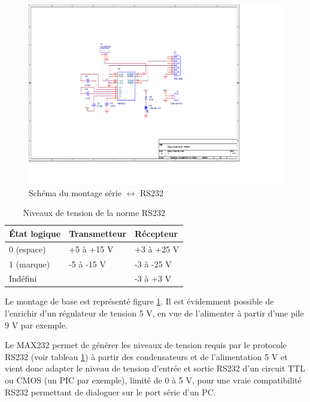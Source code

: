 \documentclass[a4paper]{article}
\begin{document}
\begin{figure}[H]
	\centering
	\includegraphics[scale=1.00]{Images/Montage_RS232}
	\caption{Schéma du montage série $\leftrightarrow$ RS232
		\label{Montage_RS232}}
\end{figure}

\begin{table}[H]
	\centering
	\begin{tabular}{|l|l|l|}\hline
			État logique & Transmetteur & Récepteur\\\hline\hline
			0 (espace) & +5 à +15 V & +3 à +25 V\\\hline
			1 (marque) & -5 à -15 V & -3 à -25 V\\\hline
			Indéfini & & -3 à +3 V\\\hline
	\end{tabular}
	\caption{Niveaux de tension de la norme RS232
		\label{Niveaux_de_tension_de_la_norme_RS232}}
\end{table}

Le montage de base est représenté figure \ref{Montage_RS232}. Il est évidemment possible de l'enrichir d'un régulateur de tension 5 V, en vue de l'alimenter à partir d'une pile 9 V par exemple.

Le MAX232 permet de générer les niveaux de tension requis par le protocole RS232 (voir tableau \ref{Niveaux_de_tension_de_la_norme_RS232}) à partir des condensateurs et de l'alimentation 5 V \cite{MAX232} et vient donc adapter le niveau de tension d'entrée et sortie RS232 d'un circuit \ac{TTL} ou \ac{CMOS} (un PIC par exemple), limité de 0 à 5 V, pour une vraie compatibilité RS232 permettant de dialoguer sur le port série d'un PC.
\end{document}
